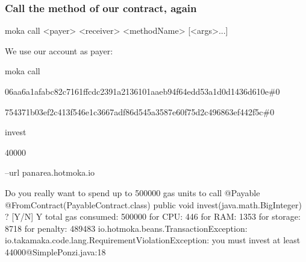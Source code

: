 \documentclass[11pt]{beamer}  %
\def\codesize{\smaller}
\def\<#1>{\codeid{#1}}
\newcommand{\codeid}[1]{\ifmmode{\mbox{\codesize\ttfamily{#1}}}\else{\codesize\ttfamily #1}\fi}
\begin{document}
\begin{frame}[fragile]\frametitle{Call the \<invest> method of our contract, again}

\begin{tt}
moka call <payer> <receiver> <methodName> [<args>...]
\end{tt}

\medskip

We use our account as payer:

\medskip

\begin{greenbox}{}
 {\color{armygreen}\scriptsize{\begin{tt}
          moka call

          06aa6a1afabc82c7161ffcdc2391a2136101aaeb94f64edd53a1d0d1436d610e\#0

          754371b03ef2c413f546e1c3667adf86d545a3587e60f75d2c496863ef442f5c\#0

          invest

          40000

          --url panarea.hotmoka.io
 \end{tt}}}
    {\tiny\begin{semiverbatim}
Do you really want to spend up to 500000 gas units to call
  {\color{red}@Payable @FromContract(PayableContract.class) public void invest(java.math.BigInteger)} ? [Y/N] Y
{\color{armygreen}total gas consumed: 500000}
{\color{darkred}  for CPU: 446
  for RAM: 1353
  for storage: 8718
  for penalty: 489483}
{\color{red}io.hotmoka.beans.TransactionException: io.takamaka.code.lang.RequirementViolationException:
  you must invest at least 44000@SimplePonzi.java:18}
\end{semiverbatim}}
\end{greenbox}

\end{frame}
\end{document}
